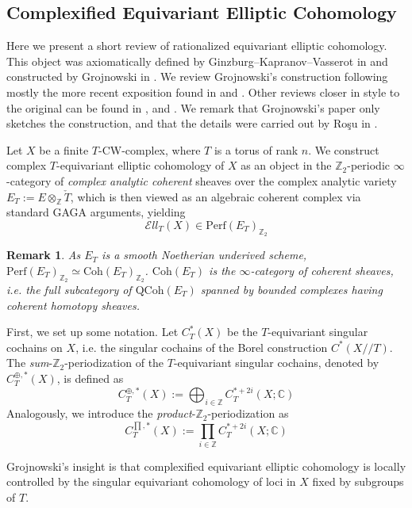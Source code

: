 \documentclass[11pt,letterpaper]{amsart}
\newtheorem{remark}[dummy]{Remark}
\newcommand{\bC}{\mathbb{C}}
\newcommand{\bZ}{\mathbb{Z}}
\newcommand{\El}{\mathcal{E}ll}
\newcommand{\Perf}{\mathrm{Perf}}
\newcommand{\QCoh}{\mathrm{QCoh}}
\newcommand{\Coh}{\mathrm{Coh}}
\begin{document}
\subsection{Complexified Equivariant Elliptic Cohomology}\label{subsection:PerlimGroj}
Here we present a short review of rationalized equivariant elliptic cohomology. This object was axiomatically defined by Ginzburg--Kapranov--Vasserot in \cite{GKV} and constructed by Grojnowski in \cite{groj}.
We review Grojnowski's construction following mostly the more recent exposition found in \cite{Gan14} and \cite{SchSib}. Other reviews closer in style to the original can be found in \cite{And1}, \cite{Ros3} and \cite{GreenRat}. We remark that Grojnowski's paper only sketches the construction, and that the details were carried out by Ro\c{s}u in \cite{Ros1}. 

Let $X$ be a finite $T$-CW-complex, where $T$ is a torus of rank $n$. We construct complex $T$-equivariant elliptic cohomology of $X$ as an object in the $\bZ_2$-periodic $\infty$-category of \emph{complex analytic coherent} sheaves over the complex analytic variety $E_T := E\otimes_{\bZ}\check{T}$, which is then viewed as an algebraic coherent complex via standard GAGA arguments, yielding
$$
\El_T(X) \in \Perf(E_T)_{\bZ_2}
$$
 
\begin{remark}
As $E_T$ is a smooth Noetherian underived scheme, $\Perf(E_T)_{\bZ_2}\simeq\Coh(E_T)_{\bZ_2}$. $\Coh(E_T)$ is the \emph{$\infty$-category of coherent sheaves}, i.e. the full subcategory of $\QCoh(E_T)$ spanned by bounded complexes having coherent homotopy sheaves.
\end{remark}

First, we set up some notation. 
Let $C_T^\ast(X)$ be the $T$-equivariant singular cochains on $X$, i.e. the singular cochains of the Borel construction $C^\ast(X//T)$. 
The \emph{sum}-$\bZ_2$-periodization of the $T$-equivariant singular cochains, denoted by $C_T^{\oplus,\ast}(X)$, is defined as
$$C_{T}^{\oplus,\ast}(X):=\bigoplus_{i\in\bZ}C_T^{\ast+2i}(X;\bC)$$
Analogously, we introduce the \emph{product}-$\bZ_2$-periodization as
$$C_{T}^{\prod,\ast}(X):=\prod_{i\in\bZ}C_T^{\ast+2i}(X;\bC)$$

Grojnowski's  insight is that complexified equivariant elliptic cohomology is locally controlled by the singular equivariant cohomology of loci in $X$ fixed by subgroups of $T$.
\end{document}
